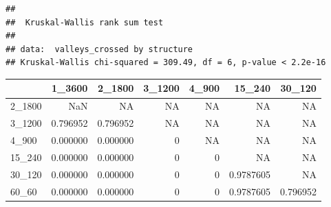 \documentclass[
]{book}
\newenvironment{Shaded}{\begin{snugshade}}{\end{snugshade}}
\newcommand{\AttributeTok}[1]{\textcolor[rgb]{0.77,0.63,0.00}{#1}}
\newcommand{\ConstantTok}[1]{\textcolor[rgb]{0.00,0.00,0.00}{#1}}
\newcommand{\FunctionTok}[1]{\textcolor[rgb]{0.00,0.00,0.00}{#1}}
\newcommand{\NormalTok}[1]{#1}
\newcommand{\OtherTok}[1]{\textcolor[rgb]{0.56,0.35,0.01}{#1}}
\newcommand{\SpecialCharTok}[1]{\textcolor[rgb]{0.00,0.00,0.00}{#1}}
\newcommand{\StringTok}[1]{\textcolor[rgb]{0.31,0.60,0.02}{#1}}
\begin{document}
\begin{verbatim}
## 
##  Kruskal-Wallis rank sum test
## 
## data:  valleys_crossed by structure
## Kruskal-Wallis chi-squared = 309.49, df = 6, p-value < 2.2e-16
\end{verbatim}

\begin{Shaded}
\end{Shaded}

\begin{table}
\centering
\begin{tabular}[t]{l|r|r|r|r|r|r}
\hline
  & 1\_3600 & 2\_1800 & 3\_1200 & 4\_900 & 15\_240 & 30\_120\\
\hline
2\_1800 & NaN & NA & NA & NA & NA & NA\\
\hline
3\_1200 & 0.796952 & 0.796952 & NA & NA & NA & NA\\
\hline
4\_900 & 0.000000 & 0.000000 & 0 & NA & NA & NA\\
\hline
15\_240 & 0.000000 & 0.000000 & 0 & 0 & NA & NA\\
\hline
30\_120 & 0.000000 & 0.000000 & 0 & 0 & 0.9787605 & NA\\
\hline
60\_60 & 0.000000 & 0.000000 & 0 & 0 & 0.9787605 & 0.796952\\
\hline
\end{tabular}
\end{table}

  
\end{document}
